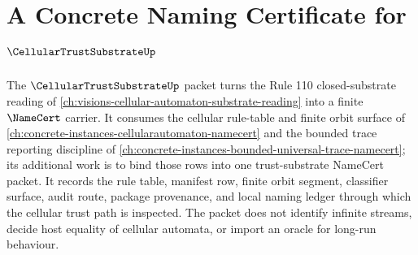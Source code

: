 \chapter{A Concrete Naming Certificate for $\CellularTrustSubstrateUp$}
\label{ch:concrete-instances-cellulartrustsubstrate-namecert}

The $\CellularTrustSubstrateUp$ packet turns the Rule 110 closed-substrate reading of \autoref{ch:visions-cellular-automaton-substrate-reading} into a finite $\NameCert$ carrier. It consumes the cellular rule-table and finite orbit surface of \autoref{ch:concrete-instances-cellularautomaton-namecert} and the bounded trace reporting discipline of \autoref{ch:concrete-instances-bounded-universal-trace-namecert}; its additional work is to bind those rows into one trust-substrate NameCert packet. It records the rule table, manifest row, finite orbit segment, classifier surface, audit route, package provenance, and local naming ledger through which the cellular trust path is inspected. The packet does not identify infinite streams, decide host equality of cellular automata, or import an oracle for long-run behaviour.



